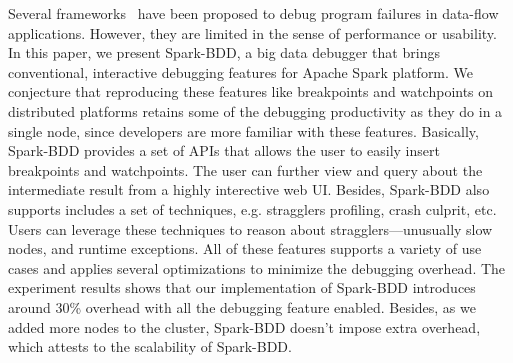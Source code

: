 \documentclass{acm_proc_article-sp}
\begin{document}
Several frameworks~\cite{olston2011inspector, jagannath2011monitoring, dave2013arthur} have been proposed to debug program failures in data-flow applications. However, they are limited in the sense of performance or usability. In this paper, we present Spark-BDD, a big data debugger that brings conventional, interactive debugging features for Apache Spark platform. We conjecture that reproducing these features like breakpoints and watchpoints on distributed platforms retains some of the debugging productivity as they do in a single node, since developers are more familiar with these features. Basically, Spark-BDD provides a set of APIs that allows the user to easily insert breakpoints and watchpoints. The user can further view and query about the intermediate result from a highly interective web UI. Besides, Spark-BDD also supports includes a set of techniques, e.g. stragglers profiling, crash culprit, etc. Users can leverage these techniques to reason about stragglers---unusually slow nodes, and runtime exceptions. All of these features supports a variety of use cases and applies several optimizations to minimize the debugging overhead. The experiment results shows that our implementation of Spark-BDD introduces around 30\% overhead with all the debugging feature enabled. Besides, as we added more nodes to the cluster, Spark-BDD doesn't impose extra overhead, which attests to the scalability of Spark-BDD. 
\end{document}
